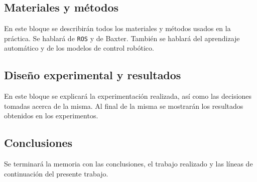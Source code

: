 \subsection{Materiales y métodos}
En este bloque se describirán todos los materiales y métodos usados en la práctica. Se hablará de \texttt{ROS} y de Baxter. También se hablará del aprendizaje automático y de los modelos de control robótico.

\subsection{Diseño experimental y resultados}
En este bloque se explicará la experimentación realizada, así como las decisiones tomadas acerca de la misma. Al final de la misma se mostrarán los resultados obtenidos en los experimentos.

\subsection{Conclusiones}
Se terminará la memoria con las conclusiones, el trabajo realizado y las líneas de continuación del presente trabajo.